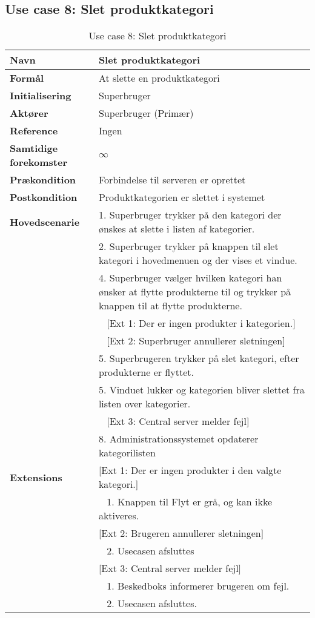 \subsection{Use case 8: Slet produktkategori}

\begin{table}[H]
\begin{tabularx}{\textwidth}{|l|X|}
\hline
\textbf{Navn}					& Slet produktkategori \\\hline
\textbf{Formål}					& At slette en produktkategori \\\hline
\textbf{Initialisering}			& Superbruger \\\hline
\textbf{Aktører}				& Superbruger (Primær)\\\hline
\textbf{Reference}				& Ingen \\\hline
								
\textbf{Samtidige forekomster}	& $\infty$ \\\hline
\textbf{Prækondition}			& Forbindelse til serveren er oprettet \\\hline
\textbf{Postkondition}			& Produktkategorien er slettet i systemet \\\hline

\textbf{Hovedscenarie}			& 1. Superbruger trykker på den kategori der ønskes at slette i listen af kategorier. \\		
								& 2. Superbruger trykker på knappen til slet kategori i hovedmenuen og der vises et vindue.\\
								& 4. Superbruger vælger hvilken kategori han ønsker at flytte produkterne til og trykker på knappen til at flytte produkterne.\\
								& ~ [Ext 1: Der er ingen produkter i kategorien.]\\
								& ~ [Ext 2: Superbruger annullerer sletningen]\\
								& 5. Superbrugeren trykker på slet kategori, efter produkterne er flyttet.\\
								& 5. Vinduet lukker og kategorien bliver slettet fra listen over kategorier.\\
								& ~ [Ext 3: Central server melder fejl]\\
								& 8. Administrationssystemet opdaterer kategorilisten \\\hline

\textbf{Extensions}							
  								& [Ext 1: Der er ingen produkter i den valgte kategori.] \\
  								& ~ 1. Knappen til Flyt er grå, og kan ikke aktiveres.\\
  								& [Ext 2: Brugeren annullerer sletningen]\\
  								& ~ 2. Usecasen afsluttes \\
								
								& [Ext 3: Central server melder fejl]\\
								& ~ 1. Beskedboks informerer brugeren om fejl.\\
								& ~ 2. Usecasen afsluttes.\\\hline
\end{tabularx}
\caption{Use case 8: Slet produktkategori}
\label{tab:UCspk}
\end{table}
